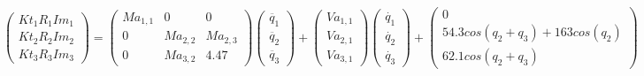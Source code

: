 \[
	\begin{pmatrix}
	Kt_{1}R_{1}Im_{1} \\
	Kt_{2}R_{2}Im_{2} \\
	Kt_{3}R_{3}Im_{3}
	\end{pmatrix} =
	\begin{pmatrix}
	Ma_{1,1} & 0 & 0 \\
	0 & Ma_{2,2} & Ma_{2,3}\\
	0 & Ma_{3,2} & 4.47
	\end{pmatrix}
	\begin{pmatrix}
	\ddot{q_{1}} \\
	\ddot{q_{2}}  \\
	\ddot{q_{3}}
\end{pmatrix} +
\begin{pmatrix}
	Va_{1,1}\\
	Va_{2,1} \\
  Va_{3,1}
\end{pmatrix}
\begin{pmatrix}
		\dot{q_{1}} \\
		\dot{q_{2}}  \\
		\dot{q_{3}}
\end{pmatrix} +
\begin{pmatrix}
	0 \\
54.3cos(q_{2} + q_{3}) + 163cos(q_{2}) \\
62.1cos(q_{2} + q_{3})
\end{pmatrix}
\]

